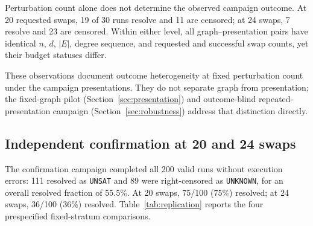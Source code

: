 \documentclass[11pt]{article}
\begin{document}
Perturbation count alone does not determine the observed campaign outcome. At 20 requested swaps, 19 of 30 runs resolve and 11 are censored; at 24 swaps, 7 resolve and 23 are censored. Within either level, all graph--presentation pairs have identical $n$, $d$, $|E|$, degree sequence, and requested and successful swap counts, yet their budget statuses differ.

These observations document outcome heterogeneity at fixed perturbation count under the campaign presentations. They do not separate graph from presentation; the fixed-graph pilot (Section~\ref{sec:presentation}) and outcome-blind repeated-presentation campaign (Section~\ref{sec:robustness}) address that distinction directly.

\subsection{Independent confirmation at 20 and 24 swaps}

The confirmation campaign completed all 200 valid runs without execution errors: 111 resolved as \texttt{UNSAT} and 89 were right-censored as \texttt{UNKNOWN}, for an overall resolved fraction of 55.5\%. At 20 swaps, 75/100 (75\%) resolved; at 24 swaps, 36/100 (36\%) resolved. Table~\ref{tab:replication} reports the four prespecified fixed-stratum comparisons.

\begin{table}[H]
\centering
\scriptsize
\caption{Independent confirmation. Cliff's delta is censored minus resolved; CI denotes the deterministic 2,000-resample percentile-bootstrap interval. Holm adjustment applies only across the two modularity tests.}
\label{tab:replication}
\end{table}
\end{document}
